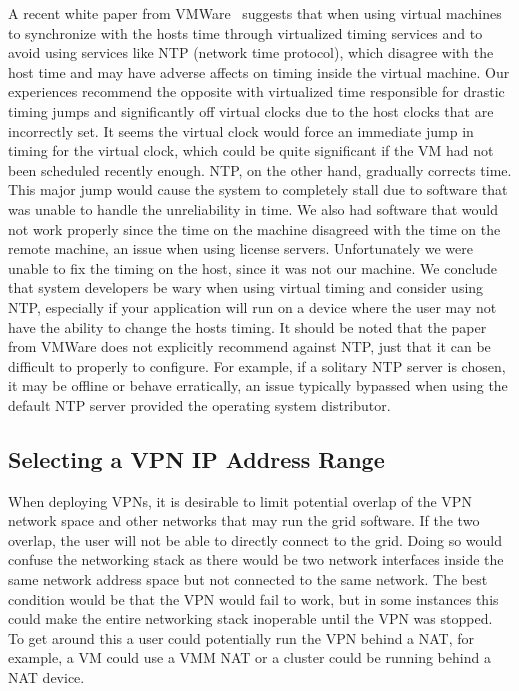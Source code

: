 \documentclass[conference]{IEEEtran}
\begin{document}
A recent white paper from VMWare~\cite{vmware_timing} suggests that when using
virtual machines to synchronize with the hosts time through virtualized timing
services and to avoid using services like NTP (network time protocol), which
disagree with the host time and may have adverse affects on timing inside the
virtual machine.  Our experiences recommend the opposite with virtualized time
responsible for drastic timing jumps and significantly off virtual clocks due
to the host clocks that are incorrectly set.  It seems the virtual clock would
force an immediate jump in timing for the virtual clock, which could be quite
significant if the VM had not been scheduled recently enough.  NTP, on the
other hand, gradually corrects time.  This major jump would cause the system to
completely stall due to software that was unable to handle the unreliability in
time.  We also had software that would not work properly since the time on the
machine disagreed with the time on the remote machine, an issue when using
license servers.  Unfortunately we were unable to fix the timing on the host,
since it was not our machine.  We conclude that system developers be wary when
using virtual timing and consider using NTP, especially if your application
will run on a device where the user may not have the ability to change the
hosts timing.  It should be noted that the paper from VMWare does not
explicitly recommend against NTP, just that it can be difficult to properly to
configure.  For example, if a solitary NTP server is chosen, it may be offline
or behave erratically, an issue typically bypassed when using the default NTP
server provided the operating system distributor.

\subsection{Selecting a VPN IP Address Range}

When deploying VPNs, it is desirable to limit potential overlap of the VPN
network space and other networks that may run the grid software.  If the two
overlap, the user will not be able to directly connect to the grid.  Doing so
would confuse the networking stack as there would be two network interfaces
inside the same network address space but not connected to the same network.
The best condition would be that the VPN would fail to work, but in some
instances this could make the entire networking stack inoperable until the VPN
was stopped.  To get around this a user could potentially run the VPN behind a
NAT, for example, a VM could use a VMM NAT or a cluster could be running behind
a NAT device.
\end{document}
